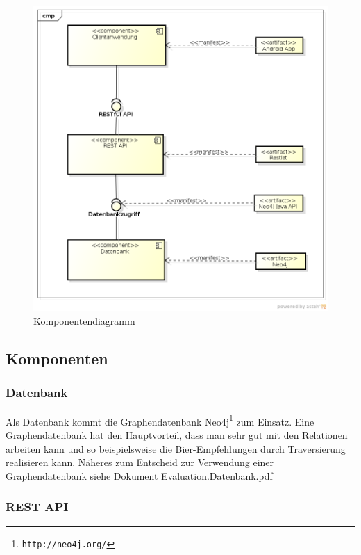 \documentclass[10pt,a4paper]{scrartcl}
\begin{document}
\begin{figure}[H]
	\includegraphics[width=\textwidth]{ComponentDiagram.png}
	\caption{Komponentendiagramm}
	\label{fig:component_diagram}
\end{figure}


\subsection{Komponenten}

\subsubsection{Datenbank}

Als Datenbank kommt die Graphendatenbank Neo4j\footnote{\texttt{http://neo4j.org/}} zum Einsatz.
Eine Graphendatenbank hat den Hauptvorteil, dass man sehr gut mit den Relationen arbeiten kann und
so beispielsweise die Bier-Empfehlungen durch Traversierung realisieren kann. Näheres zum Entscheid
zur Verwendung einer Graphendatenbank siehe Dokument Evaluation.Datenbank.pdf

\subsubsection{REST API}
\end{document}
